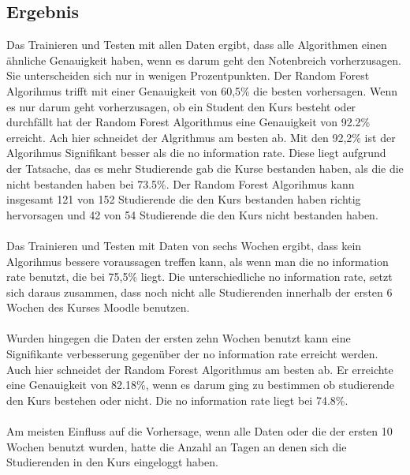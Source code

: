 \subsection{Ergebnis}
Das Trainieren und Testen mit allen Daten ergibt, dass alle Algorithmen einen ähnliche Genauigkeit haben, wenn es darum geht den Notenbreich vorherzusagen.
Sie unterscheiden sich nur in wenigen Prozentpunkten. Der Random Forest Algorihmus trifft mit einer Genauigkeit von 60,5\% die besten vorhersagen.
Wenn es nur darum geht vorherzusagen, ob ein Student den Kurs besteht oder durchfällt hat der Random Forest Algorithmus eine Genauigkeit von 92.2\% erreicht. 
Ach hier schneidet der Algrithmus am besten ab. Mit den 92,2\% ist der Algorihmus Signifikant besser als die \glqq no information rate\grqq{}. 
Diese liegt aufgrund der Tatsache, das es mehr Studierende gab die Kurse bestanden haben, als die die nicht bestanden haben bei 73.5\%. 
Der Random Forest Algorihmus kann insgesamt 121 von 152 Studierende die den Kurs bestanden haben richtig hervorsagen und 42 von 54 Studierende die den Kurs nicht bestanden haben. \cite[S. 9f]{Quinn.2020}
\\ \\ \noindent
Das Trainieren und Testen mit Daten von sechs Wochen ergibt, dass kein Algorihmus bessere voraussagen treffen kann, als wenn man die \glqq no information rate\grqq{} benutzt,
die bei 75,5\% liegt. Die unterschiedliche \glqq no information rate\grqq{}, setzt sich daraus zusammen, dass noch nicht alle Studierenden innerhalb der ersten 6 Wochen des Kurses Moodle benutzen. \cite[S. 10f]{Quinn.2020}
\\ \noindent \\ \noindent
Wurden hingegen die Daten der ersten zehn Wochen benutzt kann eine Signifikante verbesserung gegenüber der \glqq no information rate\grqq{} erreicht werden. 
Auch hier schneidet der Random Forest Algorithmus am besten ab. Er erreichte eine Genauigkeit von 82.18\%, wenn es darum ging zu bestimmen ob studierende den Kurs bestehen oder nicht. 
Die \glqq no information rate\grqq{} liegt bei 74.8\%. \cite[S. 10f]{Quinn.2020}
\\ \noindent \newline \noindent
\\ \noindent \newline \noindent
Am meisten Einfluss auf die Vorhersage, wenn alle Daten oder die der ersten 10 Wochen benutzt wurden, hatte die Anzahl an Tagen an denen sich die Studierenden in den Kurs eingeloggt haben. \cite[S. 15]{Quinn.2020}

